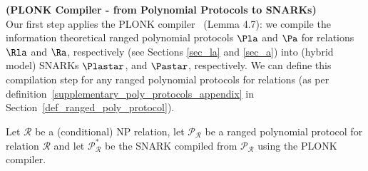 \noindent \textbf{(PLONK Compiler - from Polynomial Protocols to SNARKs)} \\

\noindent Our first step applies the PLONK compiler~\cite{plonk} (Lemma 4.7): we compile the information theoretical ranged polynomial protocols $\Pla$ and $\Pa$ 
for relations $\Rla$ and $\Ra$, respectively (see Sections \ref{sec_la} and \ref{sec_a}) into 
(hybrid model) SNARKs $\Plastar$, and $\Pastar$, respectively. We can define this compilation step 
for any ranged polynomial protocols for relations (as per definition~\ref{supplementary_poly_protocols_appendix} in Section~\ref{def_ranged_poly_protocol}). 
\begin{comment}
In order to do that we need: 
\begin{itemize}
\item  The batched version of KZG polynomial commitments~\cite{KZG_10} described in Section 3 of PLONK~\cite{plonk}.\footnote{In fact, 
one can replace the use of KZG polynomial commitments with any binding polynomial commitment that has knowledge-soundness, including non-homomorphic polynomial commitments, 
such as FRI-based polynomial commitments (e.g., RedShift~\cite{redshift}). If the optimisation gained from PLONK linearisation technique is a goal, 
then, with minimal changes one can use any homomorphic polynomial commitment, e.g., the discrete logarithm based polynomial commitment 
from Halo~\cite{halo}.}
\item A general compilation technique: such a technique has been already defined in Lemma 4.7 of PLONK; combined with lemma 4.5 
from PLONK this technique can be applied with minor adaptations (this includes the corresponding technical measures) to the notion of ranged 
polynomial protocols.  
\item So far, both the ranged polynomial protocols for relations and the protocols resulted after the first compilation step have been explicitly defined as interactive 
protocols. In order to obtain the non-interactive version of the latter (essentially the N in SNARK) one has to apply the Fiat-Shamir 
transform~\cite{FS_transform}, \cite{FS_transform_with_proof}, \cite{SE_plonk}.
\end{itemize}

\end{comment}
\noindent Let $\mathcal{R}$ be a (conditional) NP relation, let $\mathscr{P}_{\mathcal{R}}$ be a ranged polynomial protocol for 
relation $\mathcal{R}$ and let $\mathscr{P}^*_{\mathcal{R}}$ be the SNARK compiled from $\mathscr{P}_{\mathcal{R}}$ using the PLONK compiler.  
